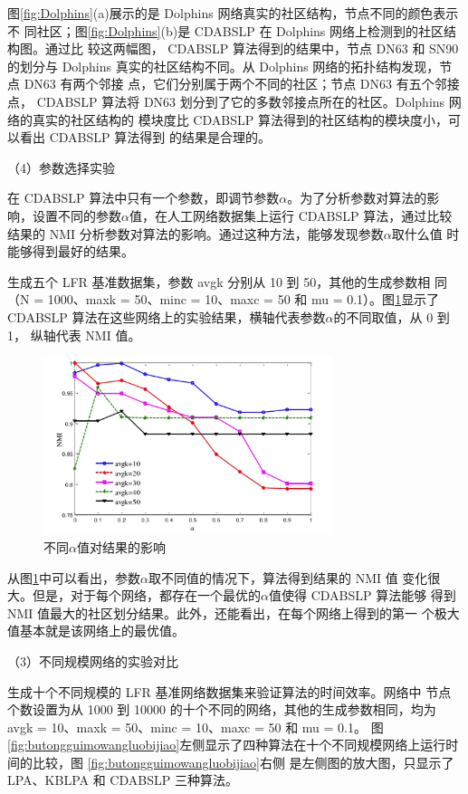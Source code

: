 图\ref{fig:Dolphins}(a)展示的是 Dolphins 网络真实的社区结构，节点不同的颜色表示不
同社区；图\ref{fig:Dolphins}(b)是 CDABSLP 在 Dolphins 网络上检测到的社区结构图。通过比
较这两幅图， CDABSLP 算法得到的结果中，节点 DN63 和 SN90 的划分与 Dolphins
真实的社区结构不同。从 Dolphins 网络的拓扑结构发现，节点 DN63 有两个邻接
点，它们分别属于两个不同的社区；节点 DN63 有五个邻接点， CDABSLP 算法将
DN63 划分到了它的多数邻接点所在的社区。Dolphins 网络的真实的社区结构的
模块度比 CDABSLP 算法得到的社区结构的模块度小，可以看出 CDABSLP 算法得到
的结果是合理的。

（4）参数选择实验

在 CDABSLP 算法中只有一个参数，即调节参数$\alpha$。为了分析参数对算法的影
响，设置不同的参数$\alpha$值，在人工网络数据集上运行 CDABSLP 算法，通过比较
结果的 NMI 分析参数对算法的影响。通过这种方法，能够发现参数$\alpha$取什么值
时能够得到最好的结果。

生成五个 LFR 基准数据集，参数 avgk 分别从 10 到 50，其他的生成参数相
同（N = 1000、maxk = 50、minc = 10、maxc = 50 和 mu = 0.1）。图\ref{fig:alpha}显示了
CDABSLP 算法在这些网络上的实验结果，横轴代表参数$\alpha$的不同取值，从 0 到 1，
纵轴代表 NMI 值。

\begin{figure}
  \centering
  \includegraphics[width=0.75\textwidth]{figures/alpha}
  \caption{不同$\alpha$值对结果的影响}\label{fig:alpha}
\end{figure}

从图\ref{fig:alpha}中可以看出，参数$\alpha$取不同值的情况下，算法得到结果的 NMI 值
变化很大。但是，对于每个网络，都存在一个最优的$\alpha$值使得 CDABSLP 算法能够
得到 NMI 值最大的社区划分结果。此外，还能看出，在每个网络上得到的第一
个极大值基本就是该网络上的最优值。

（3）不同规模网络的实验对比

生成十个不同规模的 LFR 基准网络数据集来验证算法的时间效率。网络中
节点个数设置为从 1000 到 10000 的十个不同的网络，其他的生成参数相同，均为
avgk = 10、maxk = 50、minc = 10、maxc = 50 和 mu = 0.1。 
图\ref{fig:butongguimowangluobijiao}左侧显示了四种算法在十个不同规模网络上运行时间的比较，图 \ref{fig:butongguimowangluobijiao}右侧
是左侧图的放大图，只显示了 LPA、KBLPA 和 CDABSLP 三种算法。

